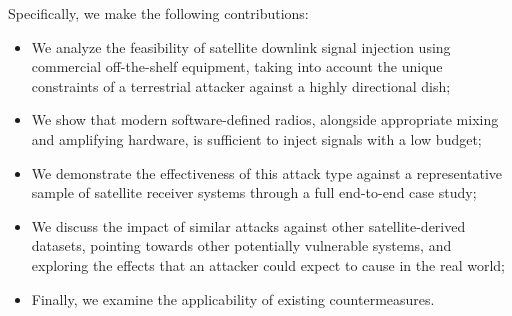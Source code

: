 Specifically, we make the following contributions:

\begin{itemize}
    \item We analyze the feasibility of satellite downlink signal injection using commercial off-the-shelf equipment, taking into account the unique constraints of a terrestrial attacker against a highly directional dish;
    \item We show that modern software-defined radios, alongside appropriate mixing and amplifying hardware, is sufficient to inject signals with a low budget;
    \item We demonstrate the effectiveness of this attack type against a representative sample of satellite receiver systems through a full end-to-end case study;
    \item We discuss the impact of similar attacks against other satellite-derived datasets, pointing towards other potentially vulnerable systems, and exploring the effects that an attacker could expect to cause in the real world;
    \item Finally, we examine the applicability of existing countermeasures.
\end{itemize}
